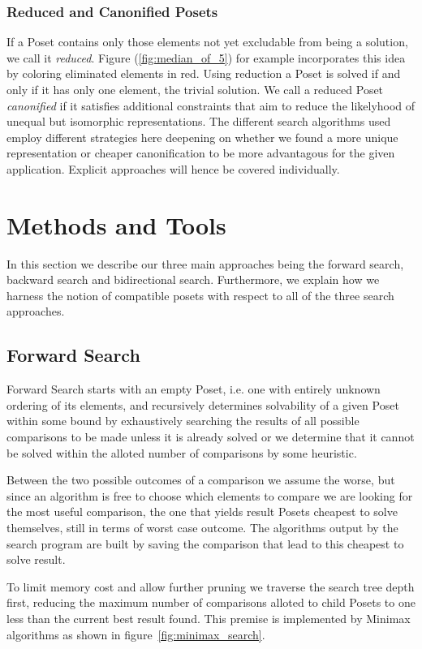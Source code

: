 \documentclass[10pt,journal,compsoc]{IEEEtran}
\begin{document}
\subsubsection{Reduced and Canonified Posets}

If a Poset contains only those elements not yet excludable from being a solution, we call it \textit{reduced}.
Figure (\ref{fig:median_of_5}) for example incorporates this idea by
coloring eliminated elements in red.
Using reduction a Poset is solved if and only if it has only one element, the trivial solution.
We call a reduced Poset \textit{canonified} if it satisfies additional constraints that
aim to reduce the likelyhood of unequal but isomorphic representations.
The different search algorithms used employ different strategies here deepening on whether we
found a more unique representation or cheaper canonification to be more advantagous for
the given application. Explicit approaches will hence be covered individually.


\section{Methods and Tools}
In this section we describe our three main approaches being the forward search, backward search and bidirectional search. Furthermore, we explain how we harness the notion of compatible posets with respect to all of the three search approaches.

\subsection{Forward Search}\label{chapter:forward_search}
Forward Search starts with an empty Poset, i.e. one with entirely unknown ordering of its elements,
and recursively determines solvability of a given Poset within some bound by exhaustively searching
the results of all possible comparisons to be made unless it is already solved or we determine that
it cannot be solved within the alloted number of comparisons by some heuristic.

Between the two possible outcomes of a comparison we assume the worse, but since an algorithm is
free to choose which elements to compare we are looking for the most useful comparison, the one that
yields result Posets cheapest to solve themselves, still in terms of worst case outcome. The
algorithms output by the search program are built by saving the comparison that lead to this
cheapest to solve result.

To limit memory cost and allow further pruning we traverse the search tree depth first, reducing the
maximum number of comparisons alloted to child Posets to one less than the current best result
found. This premise is implemented by Minimax algorithms as shown in
figure~\ref{fig:minimax_search}.
\end{document}
